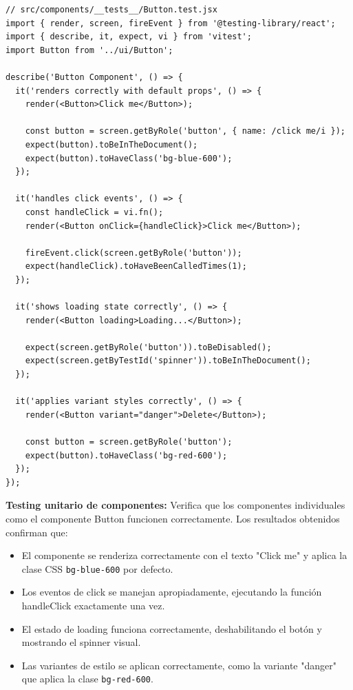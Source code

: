 \documentclass[12pt,a4paper,oneside]{report}
\begin{document}
\begin{lstlisting}
// src/components/__tests__/Button.test.jsx
import { render, screen, fireEvent } from '@testing-library/react';
import { describe, it, expect, vi } from 'vitest';
import Button from '../ui/Button';

describe('Button Component', () => {
  it('renders correctly with default props', () => {
    render(<Button>Click me</Button>);
    
    const button = screen.getByRole('button', { name: /click me/i });
    expect(button).toBeInTheDocument();
    expect(button).toHaveClass('bg-blue-600');
  });

  it('handles click events', () => {
    const handleClick = vi.fn();
    render(<Button onClick={handleClick}>Click me</Button>);
    
    fireEvent.click(screen.getByRole('button'));
    expect(handleClick).toHaveBeenCalledTimes(1);
  });

  it('shows loading state correctly', () => {
    render(<Button loading>Loading...</Button>);
    
    expect(screen.getByRole('button')).toBeDisabled();
    expect(screen.getByTestId('spinner')).toBeInTheDocument();
  });

  it('applies variant styles correctly', () => {
    render(<Button variant="danger">Delete</Button>);
    
    const button = screen.getByRole('button');
    expect(button).toHaveClass('bg-red-600');
  });
});
\end{lstlisting}

\textbf{Testing unitario de componentes:} Verifica que los componentes individuales como el componente Button funcionen correctamente. Los resultados obtenidos confirman que:
\begin{itemize}
\item El componente se renderiza correctamente con el texto "Click me" y aplica la clase CSS \texttt{bg-blue-600} por defecto.
\item Los eventos de click se manejan apropiadamente, ejecutando la función handleClick exactamente una vez.
\item El estado de loading funciona correctamente, deshabilitando el botón y mostrando el spinner visual.
\item Las variantes de estilo se aplican correctamente, como la variante "danger" que aplica la clase \texttt{bg-red-600}.
\end{itemize}
\end{document}

